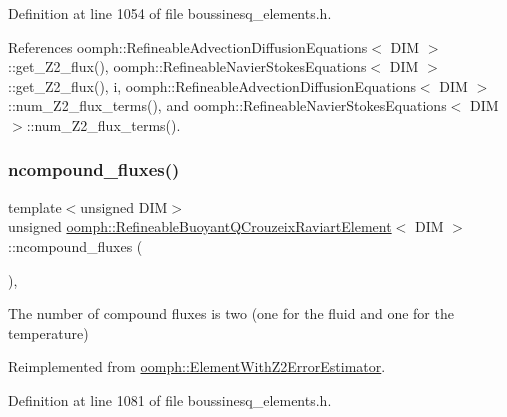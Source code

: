 Definition at line 1054 of file boussinesq\+\_\+elements.\+h.



References oomph\+::\+Refineable\+Advection\+Diffusion\+Equations$<$ D\+I\+M $>$\+::get\+\_\+\+Z2\+\_\+flux(), oomph\+::\+Refineable\+Navier\+Stokes\+Equations$<$ D\+I\+M $>$\+::get\+\_\+\+Z2\+\_\+flux(), i, oomph\+::\+Refineable\+Advection\+Diffusion\+Equations$<$ D\+I\+M $>$\+::num\+\_\+\+Z2\+\_\+flux\+\_\+terms(), and oomph\+::\+Refineable\+Navier\+Stokes\+Equations$<$ D\+I\+M $>$\+::num\+\_\+\+Z2\+\_\+flux\+\_\+terms().

\mbox{\label{classoomph_1_1RefineableBuoyantQCrouzeixRaviartElement_a395397240c5745ad7ed66ce6f66b5d99}} 
\subsubsection{\texorpdfstring{ncompound\+\_\+fluxes()}{ncompound\_fluxes()}}
{\footnotesize\ttfamily template$<$unsigned D\+IM$>$ \\
unsigned \hyperlink{classoomph_1_1RefineableBuoyantQCrouzeixRaviartElement}{oomph\+::\+Refineable\+Buoyant\+Q\+Crouzeix\+Raviart\+Element}$<$ D\+IM $>$\+::ncompound\+\_\+fluxes (\begin{DoxyParamCaption}{ }\end{DoxyParamCaption})\hspace{0.3cm}{\ttfamily [inline]}, {\ttfamily [virtual]}}



The number of compound fluxes is two (one for the fluid and one for the temperature) 



Reimplemented from \hyperlink{classoomph_1_1ElementWithZ2ErrorEstimator_a1c0e819954397f99f8d03a15fecb2e6d}{oomph\+::\+Element\+With\+Z2\+Error\+Estimator}.



Definition at line 1081 of file boussinesq\+\_\+elements.\+h.

\mbox{\label{classoomph_1_1RefineableBuoyantQCrouzeixRaviartElement_a98f094a1c3080905d0e90f5ac6ebd1b6}} 
